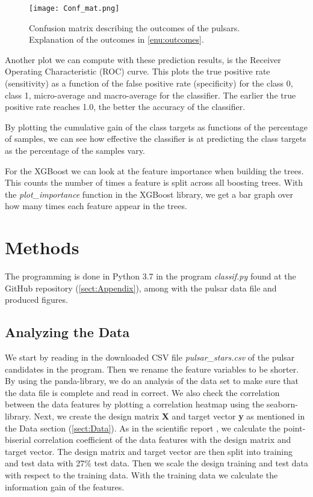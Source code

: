 \documentclass[12pt,a4paper,english]{article}
\begin{document}
\begin{figure}[h!]
	\centering\texttt{[image: Conf\_mat.png]}
	\caption{Confusion matrix describing the outcomes of the pulsars. Explanation of the outcomes in \ref{enu:outcomes}. \label{fig:conf_mat}}
\end{figure} 

Another plot we can compute with these prediction results, is the Receiver Operating Characteristic (ROC) curve. This plots the true positive rate (sensitivity) as a function of the false positive rate (specificity) for the class 0, class 1, micro-average and macro-average for the classifier. The earlier the true positive rate reaches 1.0, the better the accuracy of the classifier.

By plotting the cumulative gain of the class targets as functions of the percentage of samples, we can see how effective the classifier is at predicting the class targets as the percentage of the samples vary.

For the XGBoost we can look at the feature importance when building the trees. This counts the number of times a feature is split across all boosting trees. With the \textit{plot\_importance} function in the XGBoost library, we get a bar graph over how many times each feature appear in the trees.


\section{Methods}
\label{sect:Methods}
The programming is done in Python 3.7 in the program \textit{classif.py} found at the GitHub repository (\ref{sect:Appendix}), among with the pulsar data file and produced figures.

\subsection{Analyzing the Data}
\label{subsect:analysis}
We start by reading in the downloaded CSV file \textit{pulsar\_stars.csv} of the pulsar candidates in the program. Then we rename the feature variables to be shorter. By using the panda-library, we do an analysis of the data set to make sure that the data file is complete and read in correct. We also check the correlation between the data features by plotting a correlation heatmap using the seaborn-library. Next, we create the design matrix \textbf{X} and target vector \textbf{y} as mentioned in the Data section (\ref{sect:Data}). As in the scientific report \cite{pulsar_art}, we calculate the point-biserial correlation coefficient of the data features with the design matrix and target vector. The design matrix and target vector are then split into training and test data with 27\% test data. Then we scale the design training and test data with respect to the training data. With the training data we calculate the information gain of the features.
\end{document}
